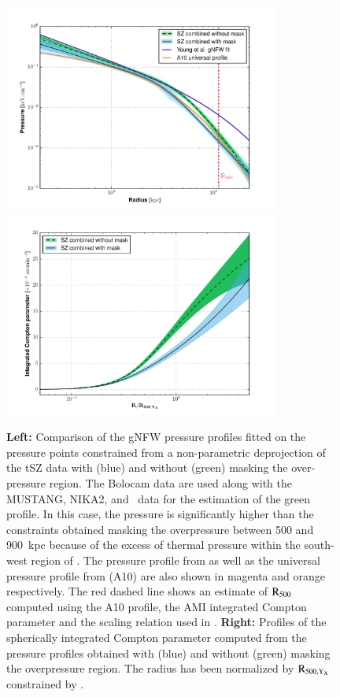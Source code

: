 \documentclass[traditabstract]{aa}
\begin{document}
\begin{figure}[h!]
\centering
\includegraphics[height=6.8cm]{P_profile_comparebis.pdf}
\includegraphics[height=6.8cm]{Y_profile_compare.pdf}
\caption{{\footnotesize \textbf{Left:} Comparison of the gNFW pressure profiles fitted on the pressure points constrained from a non-parametric deprojection of the tSZ data with (blue) and without (green) masking the over-pressure region. The Bolocam data are used along with the MUSTANG, NIKA2, and \planck\ data for the estimation of the green profile. In this case, the pressure is significantly higher than the constraints obtained masking the overpressure between 500 and 900~kpc because of the excess of thermal pressure within the south-west region of \psz. The pressure profile from \cite{you15} as well as the universal pressure profile from \cite{arn10} (A10) are also shown in magenta and orange respectively. The red dashed line shows an estimate of $\rm{R_{500}}$ computed using the A10 profile, the AMI integrated Compton parameter and the scaling relation used in \cite{pla14}. \textbf{Right:} Profiles of the spherically integrated Compton parameter computed from the pressure profiles obtained with (blue) and without (green) masking the overpressure region. The radius has been normalized by $\rm{R_{500,Y_X}}$ constrained by \xmm.}}
\label{fig:compare_prof}
\end{figure}
\end{document}
